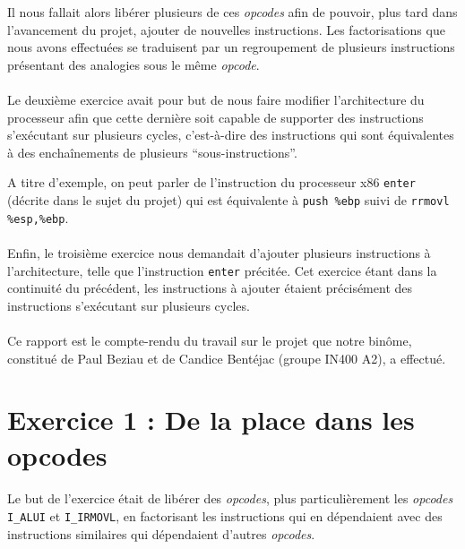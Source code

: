 \documentclass[12pt]{article}
\begin{document}
Il nous fallait alors libérer plusieurs de ces {\itshape opcodes} afin de pouvoir, plus tard dans l'avancement du projet, ajouter de nouvelles instructions. Les factorisations que nous avons effectuées se traduisent par un regroupement de plusieurs instructions présentant des analogies sous le même {\itshape opcode}.

\paragraph{}Le deuxième exercice avait pour but de nous faire modifier l'architecture du processeur afin que cette dernière soit capable de supporter des instructions s'exécutant sur plusieurs cycles, c'est-à-dire des instructions qui sont équivalentes à des enchaînements de plusieurs ``sous-instructions''.

A titre d'exemple, on peut parler de l'instruction du processeur x86 \verb+enter+ (décrite dans le sujet du projet) qui est équivalente à \verb+push %ebp+ suivi de \verb+rrmovl+\\ \verb+%esp,%ebp+.

\paragraph{}Enfin, le troisième exercice nous demandait d'ajouter plusieurs instructions à l'architecture, telle que l'instruction \verb+enter+ précitée. Cet exercice étant dans la continuité du précédent, les instructions à ajouter étaient précisément des instructions s'exécutant sur plusieurs cycles.

\paragraph{}Ce rapport est le compte-rendu du travail sur le projet que notre binôme, constitué de Paul Beziau et de Candice Bentéjac (groupe IN400 A2), a effectué.



\section{Exercice 1 : De la place dans les opcodes}
\paragraph{}Le but de l'exercice était de libérer des {\itshape opcodes}, plus particulièrement les {\itshape opcodes} \verb+I_ALUI+ et \verb+I_IRMOVL+, en factorisant les instructions qui en dépendaient avec des instructions similaires qui dépendaient d'autres {\itshape opcodes}.
\end{document}
